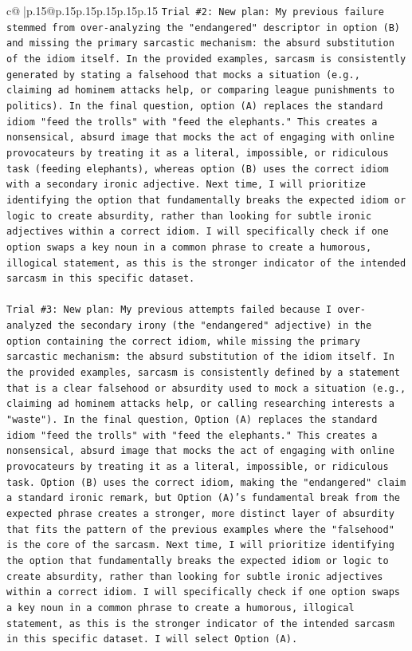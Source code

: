 \documentclass{article}
\begin{document}
{\begin{supertabular}{c@{$\;$}|p{.15\linewidth}@{}p{.15\linewidth}p{.15\linewidth}p{.15\linewidth}p{.15\linewidth}p{.15\linewidth}}
{{{\texttt{Trial \#2: New plan: My previous failure stemmed from over{-}analyzing the "endangered" descriptor in option (B) and missing the primary sarcastic mechanism: the absurd substitution of the idiom itself. In the provided examples, sarcasm is consistently generated by stating a falsehood that mocks a situation (e.g., claiming ad hominem attacks help, or comparing league punishments to politics). In the final question, option (A) replaces the standard idiom "feed the trolls" with "feed the elephants." This creates a nonsensical, absurd image that mocks the act of engaging with online provocateurs by treating it as a literal, impossible, or ridiculous task (feeding elephants), whereas option (B) uses the correct idiom with a secondary ironic adjective. Next time, I will prioritize identifying the option that fundamentally breaks the expected idiom or logic to create absurdity, rather than looking for subtle ironic adjectives within a correct idiom. I will specifically check if one option swaps a key noun in a common phrase to create a humorous, illogical statement, as this is the stronger indicator of the intended sarcasm in this specific dataset.} \\
\\ 
\texttt{Trial \#3: New plan: My previous attempts failed because I over{-}analyzed the secondary irony (the "endangered" adjective) in the option containing the correct idiom, while missing the primary sarcastic mechanism: the absurd substitution of the idiom itself. In the provided examples, sarcasm is consistently defined by a statement that is a clear falsehood or absurdity used to mock a situation (e.g., claiming ad hominem attacks help, or calling researching interests a "waste"). In the final question, Option (A) replaces the standard idiom "feed the trolls" with "feed the elephants." This creates a nonsensical, absurd image that mocks the act of engaging with online provocateurs by treating it as a literal, impossible, or ridiculous task. Option (B) uses the correct idiom, making the "endangered" claim a standard ironic remark, but Option (A)'s fundamental break from the expected phrase creates a stronger, more distinct layer of absurdity that fits the pattern of the previous examples where the "falsehood" is the core of the sarcasm. Next time, I will prioritize identifying the option that fundamentally breaks the expected idiom or logic to create absurdity, rather than looking for subtle ironic adjectives within a correct idiom. I will specifically check if one option swaps a key noun in a common phrase to create a humorous, illogical statement, as this is the stronger indicator of the intended sarcasm in this specific dataset. I will select Option (A).} \\
}}}
\end{supertabular}}
\end{document}
